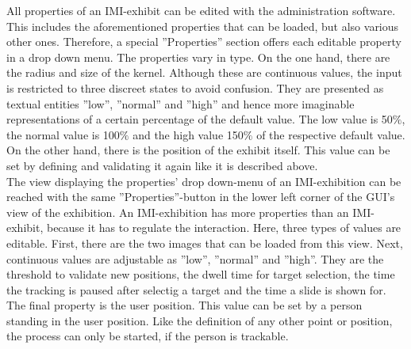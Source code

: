 All properties of an \ac{IMI}-exhibit can be edited with the administration software. This includes the aforementioned properties that can be loaded, but also various other ones. Therefore, a special ''Properties'' section offers each editable property in a drop down menu. The properties vary in type. On the one hand, there are the radius and size of the kernel. Although these are continuous values, the input is restricted to three discreet states to avoid confusion. They are presented as textual entities ''low'', ''normal'' and ''high'' and hence more imaginable representations of a certain percentage of the default value. The low value is 50$\%$, the normal value is 100$\%$ and the high value 150$\%$ of the respective default value. On the other hand, there is the position of the exhibit itself. This value can be set by defining and validating it again like it is described above.
\\
The view displaying the properties' drop down-menu of an \ac{IMI}-exhibition can be reached with the same ''Properties''-button in the lower left corner of the \ac{GUI}'s view of the exhibition. An \ac{IMI}-exhibition has more properties than an \ac{IMI}-exhibit, because it has to regulate the interaction. Here, three types of values are editable. First, there are the two images that can be loaded from this view. Next, continuous values are adjustable as ''low'', ''normal'' and ''high''. They are the threshold to validate new positions, the dwell time for target selection, the time the tracking is paused after selectig a target and the time a slide is shown for. The final property is the user position. This value can be set by a person standing in the user position. Like the definition of any other point or position, the process can only be started, if the person is trackable. 

